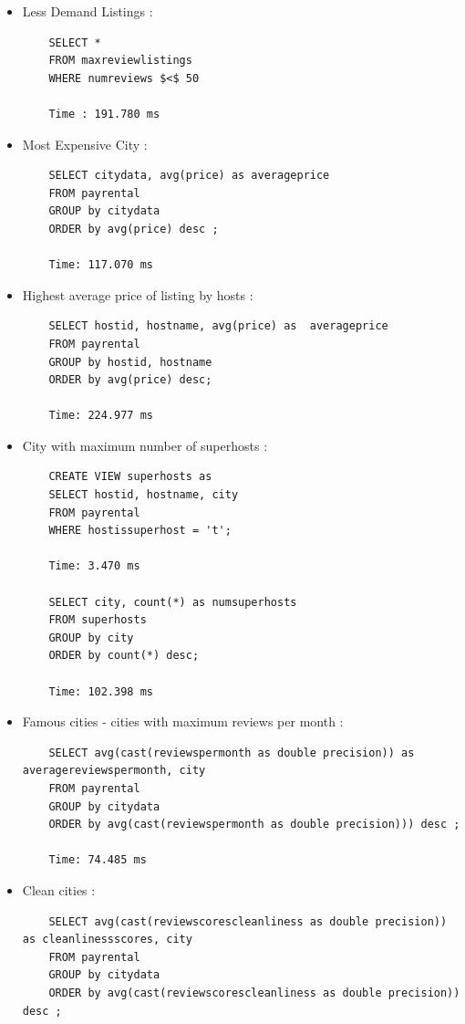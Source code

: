 \documentclass[10pt]{article}
\begin{document}
\begin{enumerate}
\begin{itemize}
    \item Less Demand Listings :
    \begin{verbatim}
    SELECT *
    FROM maxreviewlistings
    WHERE numreviews $<$ 50

    Time : 191.780 ms
    \end{verbatim}

    \item Most Expensive City :
    \begin{verbatim}
    SELECT citydata, avg(price) as averageprice
    FROM payrental
    GROUP by citydata
    ORDER by avg(price) desc ;

    Time: 117.070 ms
    \end{verbatim}
    
    \item Highest average price of listing by hosts :
    \begin{verbatim}
    SELECT hostid, hostname, avg(price) as  averageprice
    FROM payrental
    GROUP by hostid, hostname
    ORDER by avg(price) desc;

    Time: 224.977 ms
    \end{verbatim}
    
    \item City with maximum number of superhosts :
    \begin{verbatim}
    CREATE VIEW superhosts as
    SELECT hostid, hostname, city
    FROM payrental
    WHERE hostissuperhost = 't';

    Time: 3.470 ms

    SELECT city, count(*) as numsuperhosts
    FROM superhosts
    GROUP by city
    ORDER by count(*) desc;

    Time: 102.398 ms
    \end{verbatim}
    
    \item Famous cities - cities with maximum reviews per month :
    \begin{verbatim}
    SELECT avg(cast(reviewspermonth as double precision)) as averagereviewspermonth, city
    FROM payrental
    GROUP by citydata
    ORDER by avg(cast(reviewspermonth as double precision))) desc ;

    Time: 74.485 ms
    \end{verbatim}
    
    \item Clean cities :
    \begin{verbatim}
    SELECT avg(cast(reviewscorescleanliness as double precision)) as cleanlinessscores, city
    FROM payrental
    GROUP by citydata
    ORDER by avg(cast(reviewscorescleanliness as double precision)) desc ;


\end{verbatim}
\end{itemize}
\end{enumerate}
\end{document}

